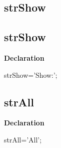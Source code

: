\documentclass{report}
\newif\ifpdf
\begin{document}
\subsection*{\large{\textbf{strShow}}\normalsize\hspace{1ex}\hrulefill}
\else
\subsection*{strShow}
\fi
\label{trstrings-strShow}
\begin{list}{}{
\setlength{\itemindent}{0cm}
\setlength{\listparindent}{0cm}
\setlength{\leftmargin}{\evensidemargin}
\addtolength{\leftmargin}{\tmplength}
\settowidth{\labelsep}{X}
\addtolength{\leftmargin}{\labelsep}
\setlength{\labelwidth}{\tmplength}
}
\item[\textbf{Declaration}\hfill]
\ifpdf
\begin{flushleft}
\fi
\begin{ttfamily}
strShow='Show:';\end{ttfamily}

\ifpdf
\end{flushleft}
\fi

\end{list}
\ifpdf
\subsection*{\large{\textbf{strAll}}\normalsize\hspace{1ex}\hrulefill}
\else
\subsection*{strAll}
\fi
\label{trstrings-strAll}
\begin{list}{}{
\setlength{\itemindent}{0cm}
\setlength{\listparindent}{0cm}
\setlength{\leftmargin}{\evensidemargin}
\addtolength{\leftmargin}{\tmplength}
\settowidth{\labelsep}{X}
\addtolength{\leftmargin}{\labelsep}
\setlength{\labelwidth}{\tmplength}
}
\item[\textbf{Declaration}\hfill]
\ifpdf
\begin{flushleft}
\fi
\begin{ttfamily}
strAll='All';\end{ttfamily}

\ifpdf
\end{flushleft}
\fi

\end{list}
\ifpdf
\end{document}
